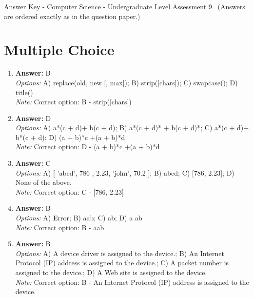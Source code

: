 \documentclass[12pt]{article}
\begin{document}
\begin{center}
Answer Key - Computer Science - Undergraduate Level Assessment 9 \
\small (Answers are ordered exactly as in the question paper.)
\end{center}

\section*{Multiple Choice}
\begin{enumerate}[label=\arabic*.]
\item \textbf{Answer:} B
\\ \textit{Options:} A) replace(old, new [, max]); B) strip([chars]); C) swapcase(); D) title()
\\ \textit{Note:} Correct option: B - strip([chars])
\item \textbf{Answer:} D
\\ \textit{Options:} A) a*(c + d)+ b(c + d); B) a*(c + d)* + b(c + d)*; C) a*(c + d)+ b*(c + d); D) (a + b)*c +(a + b)*d
\\ \textit{Note:} Correct option: D - (a + b)*c +(a + b)*d
\item \textbf{Answer:} C
\\ \textit{Options:} A) [ 'abcd', 786 , 2.23, 'john', 70.2 ]; B) abcd; C) [786, 2.23]; D) None of the above.
\\ \textit{Note:} Correct option: C - [786, 2.23]
\item \textbf{Answer:} B
\\ \textit{Options:} A) Error; B) aab; C) ab; D) a ab
\\ \textit{Note:} Correct option: B - aab
\item \textbf{Answer:} B
\\ \textit{Options:} A) A device driver is assigned to the device.; B) An Internet Protocol (IP) address is assigned to the device.; C) A packet number is assigned to the device.; D) A Web site is assigned to the device.
\\ \textit{Note:} Correct option: B - An Internet Protocol (IP) address is assigned to the device.
\end{enumerate}
\end{document}
